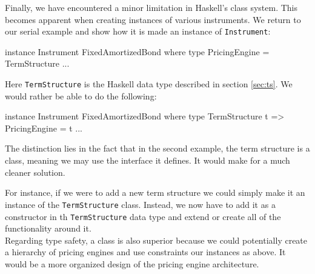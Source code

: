 Finally, we have encountered a minor limitation in Haskell's class system. This 
becomes apparent when creating instances of various instruments. We return to 
our serial example and show how it is made an instance of \texttt{Instrument}:

\begin{hscode}
instance Instrument FixedAmortizedBond where
  type PricingEngine = TermStructure
  ...
\end{hscode}

Here \texttt{TermStructure} is the Haskell data type described in section 
\ref{sec:ts}. We would rather be able to do the following:
 
\begin{hscode}
instance Instrument FixedAmortizedBond where
  type TermStructure t => PricingEngine = t
  ...
\end{hscode}

The distinction lies in the fact that in the second example, the term structure
is a class, meaning we may use the interface it defines. It would make for a much
cleaner solution.

For instance, if we were to add a new term structure we could simply make it
an instance of the \texttt{TermStructure} class. Instead, we now have to add it as a 
constructor in th \texttt{TermStructure} data type and extend or create all of
the functionality around it.\\
Regarding type safety, a class is also superior because we could potentially
create a hierarchy of pricing engines and use constraints our instances as above.
It would be a more organized design of the pricing engine architecture.

%




